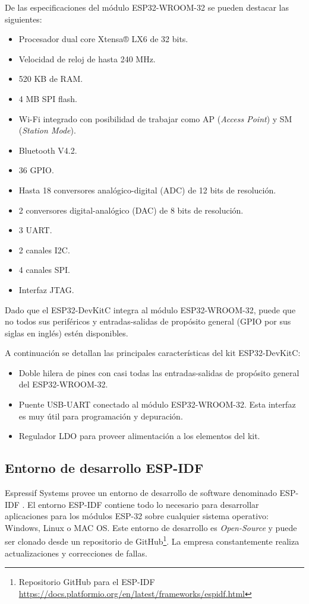 De las especificaciones del módulo ESP32-WROOM-32 se pueden destacar las siguientes:
\begin{itemize}
\item Procesador dual core Xtensa® LX6 de 32 bits.
\item Velocidad de reloj de hasta 240 MHz.
\item 520 KB de RAM.
\item 4 MB SPI flash.
\item Wi-Fi integrado con posibilidad de trabajar como AP (\textit{Access Point}) y SM (\textit{Station Mode}).
\item Bluetooth V4.2.
\item 36 GPIO.
\item Hasta 18 conversores analógico-digital (ADC) de 12 bits de resolución.
\item 2 conversores digital-analógico (DAC) de 8 bits de resolución.
\item 3 UART.
\item 2 canales I2C.
\item 4 canales SPI.
\item Interfaz JTAG.
\end{itemize}

Dado que el ESP32-DevKitC integra al módulo ESP32-WROOM-32, puede que no todos sus periféricos y entradas-salidas de propósito general (GPIO por sus siglas en inglés) estén disponibles. 

A continuación se detallan las principales características del kit ESP32-DevKitC:
\begin{itemize}
\item Doble hilera de pines con casi todas las entradas-salidas de propósito general del ESP32-WROOM-32.
\item Puente USB-UART conectado al módulo ESP32-WROOM-32. Esta interfaz es muy útil para programación y depuración.
\item Regulador LDO para proveer alimentación a los elementos del kit. 
\end{itemize}

\subsection{Entorno de desarrollo ESP-IDF}
\label{sec:ESPIDF}

Espressif Systems provee un entorno de desarrollo de software denominado ESP-IDF \citep{ESPIDF}. El entorno ESP-IDF contiene todo lo necesario para desarrollar aplicaciones para los módulos ESP-32 sobre cualquier sistema operativo: Windows, Linux o MAC OS. Este entorno de desarrollo es \textit{Open-Source} y puede ser clonado desde un repositorio de GitHub\footnote{Repositorio GitHub para el ESP-IDF \url{https://docs.platformio.org/en/latest/frameworks/espidf.html}}. La empresa constantemente realiza actualizaciones y correcciones de fallas.

